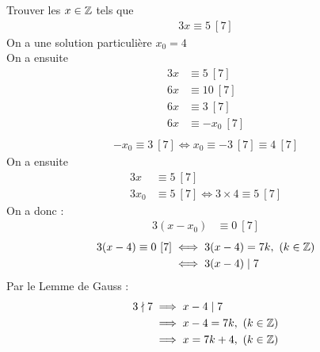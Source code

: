 \begin{exemple}
Trouver les $x \in \mathbb{Z}$ tels que 
\begin{align*}
3x \equiv 5 \ [7]
\end{align*}
On a une solution particulière $x_0 = 4$
\\
On a ensuite
\begin{align*}
3x &\equiv 5 \ [7] \\
6x &\equiv 10 \ [7] \\
6x &\equiv 3 \ [7] \\
6x &\equiv -x_0 \ [7] \\
\end{align*}
\begin{align*}
-x_0 \equiv 3 \ [7] \iff x_0 \equiv -3 \ [7] \equiv 4 \ [7]
\end{align*}
On a ensuite 
\begin{align*}
3x &\equiv 5 \ [7] \\
3x_0 &\equiv 5 \ [7] \iff 3 \times 4 \equiv 5 \ [7]
\end{align*}
On a donc :
\begin{align*}
3(x - x_0) &\equiv 0 \ [7] 
\end{align*}
\begin{align*}
3(x - 4) \equiv 0 \ [7] &\iff 3(x - 4) = 7k,\ (k \in \mathbb{Z}) \\
						&\iff 3(x - 4) \mid 7 \\
\end{align*}
Par le Lemme de Gauss :
\begin{align*}
3 \nmid 7 &\implies x - 4 \mid 7 \\
		  &\implies x - 4 = 7k,\ (k \in \mathbb{Z}) \\
		  &\implies x = 7k + 4,\ (k \in \mathbb{Z})
\end{align*}
\end{exemple}